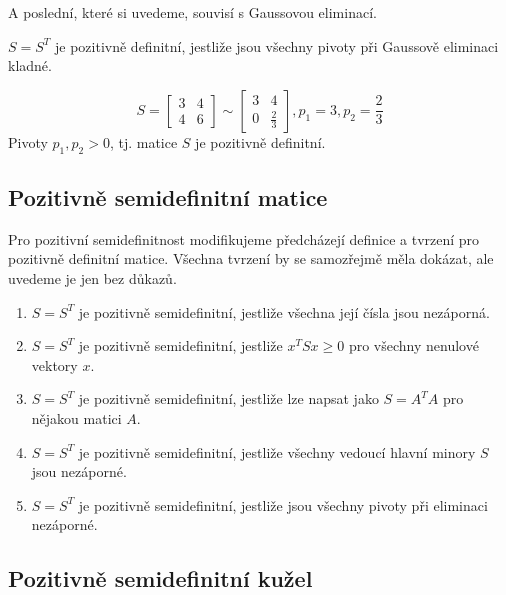 A poslední, které si uvedeme, souvisí s Gaussovou eliminací.

\begin{vt2}\cite{linear-algebra-and-learning-from-data}
    $S = S^T$ je pozitivně definitní, jestliže jsou všechny pivoty při Gaussově eliminaci kladné.
\end{vt2}

\begin{pr}
    $$  S =
        \begin{bmatrix}
            3 & 4 \\
            4 & 6
        \end{bmatrix}
        \sim
        \begin{bmatrix}
            3 & 4 \\
            0 & \frac{2}{3}
        \end{bmatrix},
        p_1 = 3, p_2 = \frac{2}{3} 
    $$
    Pivoty $p_1, p_2 > 0$, tj. matice $S$ je pozitivně definitní.
\end{pr}

\subsection*{Pozitivně semidefinitní matice}

Pro pozitivní semidefinitnost modifikujeme předcházejí definice a tvrzení pro pozitivně definitní matice. Všechna tvrzení by se samozřejmě měla dokázat, ale uvedeme je jen bez důkazů.
\begin{enumerate}
    \item $S = S^T$ je pozitivně semidefinitní, jestliže všechna její čísla jsou nezáporná.
    \item $S = S^T$ je pozitivně semidefinitní, jestliže $x^TSx \geq 0$ pro všechny nenulové vektory $x$.
    \item \cite{linear-algebra-and-learning-from-data} $S = S^T$ je pozitivně semidefinitní, jestliže lze napsat jako $S = A^T A$ pro nějakou matici $A$.
    \item \cite{linear-algebra-and-learning-from-data} $S = S^T$ je pozitivně semidefinitní, jestliže všechny vedoucí hlavní minory $S$ jsou nezáporné.
    \item \cite{linear-algebra-and-learning-from-data} $S = S^T$ je pozitivně semidefinitní, jestliže jsou všechny pivoty při eliminaci nezáporné.
\end{enumerate}

\subsection*{Pozitivně semidefinitní kužel}

